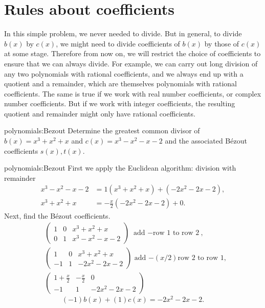 \section{Rules about coefficients}
In this simple problem, we never needed to divide.
But in general, to divide \(b(x)\) by \(c(x)\), we might need to divide coefficients of \(b(x)\) by those of \(c(x)\) at some stage.
Therefore from now on, we will restrict the choice of coefficients to ensure that we can always divide.
For example, we can carry out long division of any two polynomials with rational coefficients, and we always end up with a quotient and a remainder, which are themselves polynomials with rational coefficients.
The same is true if we work with real number coefficients, or complex number coefficients.
But if we work with integer coefficients, the resulting quotient and remainder might only have rational coefficients.
\begin{problem}{polynomials:Bezout}
Determine the greatest common divisor of \(b(x) = x^3+x^2+x\) and \(c(x) = x^3-x^2-x-2\) and the associated B\'ezout coefficients \(s(x), t(x)\).
\end{problem}
\begin{answer}{polynomials:Bezout}
First we apply the Euclidean algorithm: division with remainder
\begin{align*}
x^3-x^2-x-2&=1(x^3+x^2+x)+(-2x^2-2x-2),\\
x^3+x^2+x&=-\frac{x}{2}(-2x^2-2x-2)+0.
\end{align*}
Next, find the B\'ezout coefficients.
\begin{align*}
& \begin{pmatrix}
    1 & 0 & x^3+x^2+x \\
    0 & 1 & x^3-x^2-x-2
  \end{pmatrix} \text{ add $-$row 1 to row 2}, 
  \\
& \begin{pmatrix}
    1 & 0 & x^3+x^2+x \\
    -1 & 1 & -2x^2-2x-2
  \end{pmatrix} \text{ add $-(x/2)$row 2 to row 1}, 
  \\
& \begin{pmatrix}
    1+\frac{x}{2} & -\frac{x}{2} & 0 \\
    -1 & 1 & -2x^2-2x-2
  \end{pmatrix} 
\end{align*}
\[
(-1)b(x)+(1)c(x)=-2x^2-2x-2.
\]
\end{answer}

